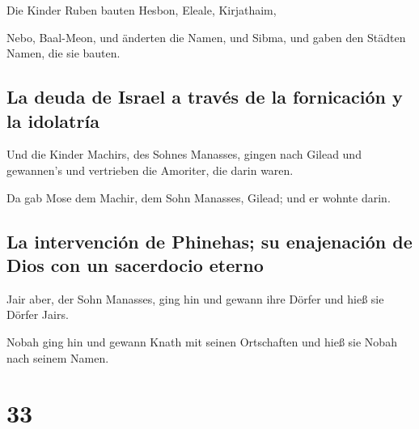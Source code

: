  Die Kinder Ruben bauten Hesbon, Eleale, Kirjathaim,

 Nebo, Baal-Meon, und änderten die Namen, und Sibma, und
gaben den Städten Namen, die sie bauten.

\hypertarget{la-deuda-de-israel-a-travuxe9s-de-la-fornicaciuxf3n-y-la-idolatruxeda}{%
\subsection{La deuda de Israel a través de la fornicación y la
idolatría}\label{la-deuda-de-israel-a-travuxe9s-de-la-fornicaciuxf3n-y-la-idolatruxeda}}

 Und die Kinder Machirs, des Sohnes Manasses, gingen nach
Gilead und gewannen's und vertrieben die Amoriter, die darin waren.

 Da gab Mose dem Machir, dem Sohn Manasses, Gilead; und
er wohnte darin.

\hypertarget{la-intervenciuxf3n-de-phinehas-su-enajenaciuxf3n-de-dios-con-un-sacerdocio-eterno}{%
\subsection{La intervención de Phinehas; su enajenación de Dios con un
sacerdocio
eterno}\label{la-intervenciuxf3n-de-phinehas-su-enajenaciuxf3n-de-dios-con-un-sacerdocio-eterno}}

 Jair aber, der Sohn Manasses, ging hin und gewann ihre
Dörfer und hieß sie Dörfer Jairs.

 Nobah ging hin und gewann Knath mit seinen Ortschaften
und hieß sie Nobah nach seinem Namen.

\hypertarget{section-32}{%
\section{33}\label{section-32}}

